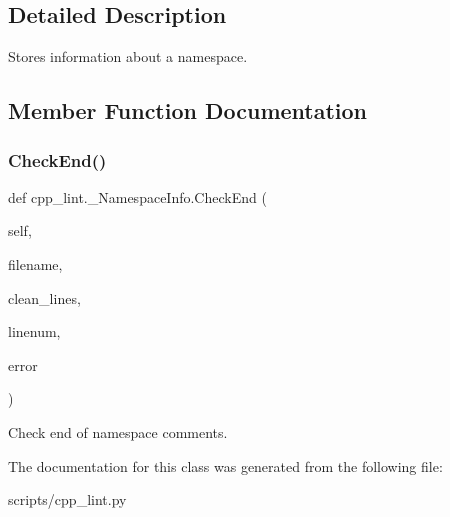 \subsection{Detailed Description}
\begin{DoxyVerb}Stores information about a namespace.\end{DoxyVerb}
 

\subsection{Member Function Documentation}
\mbox{\label{classcpp__lint_1_1___namespace_info_ad119120161c94fea85e4152b563f15c6}} 
\subsubsection{\texorpdfstring{Check\+End()}{CheckEnd()}}
{\footnotesize\ttfamily def cpp\+\_\+lint.\+\_\+\+Namespace\+Info.\+Check\+End (\begin{DoxyParamCaption}\item[{}]{self,  }\item[{}]{filename,  }\item[{}]{clean\+\_\+lines,  }\item[{}]{linenum,  }\item[{}]{error }\end{DoxyParamCaption})}

\begin{DoxyVerb}Check end of namespace comments.\end{DoxyVerb}
 

The documentation for this class was generated from the following file\+:\begin{DoxyCompactItemize}
\item 
scripts/cpp\+\_\+lint.\+py\end{DoxyCompactItemize}
